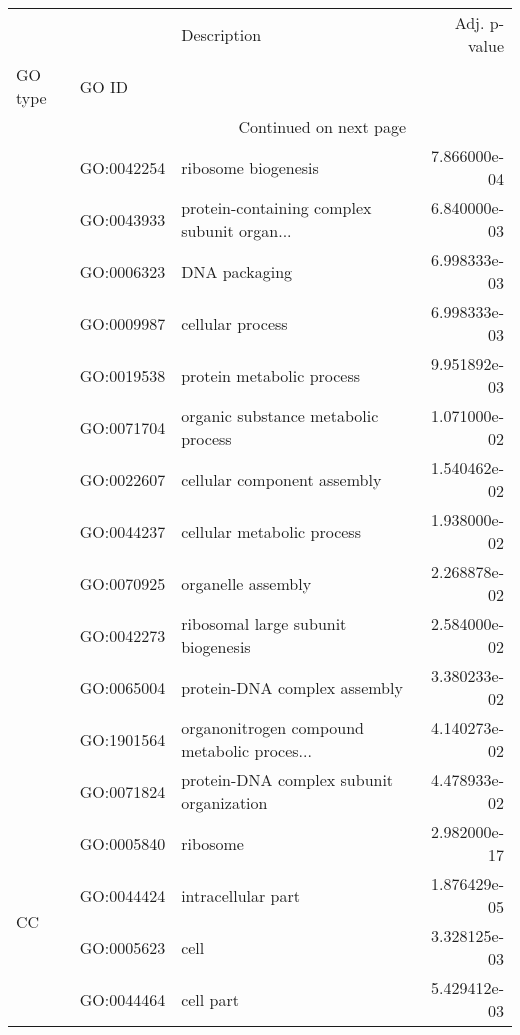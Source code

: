 \begin{longtable}{lllr}
\toprule
   &            &                                  Description &  Adj. p-value \\
GO type & GO ID &                                              &               \\
\midrule
\endhead
\midrule
\multicolumn{3}{r}{{Continued on next page}} \\
\midrule
\endfoot

\bottomrule
\endlastfoot
\multirow{13}{*}{BP} & GO:0042254 &                          ribosome biogenesis &  7.866000e-04 \\
   & GO:0043933 &  protein-containing complex subunit organ... &  6.840000e-03 \\
   & GO:0006323 &                                DNA packaging &  6.998333e-03 \\
   & GO:0009987 &                             cellular process &  6.998333e-03 \\
   & GO:0019538 &                    protein metabolic process &  9.951892e-03 \\
   & GO:0071704 &          organic substance metabolic process &  1.071000e-02 \\
   & GO:0022607 &                  cellular component assembly &  1.540462e-02 \\
   & GO:0044237 &                   cellular metabolic process &  1.938000e-02 \\
   & GO:0070925 &                           organelle assembly &  2.268878e-02 \\
   & GO:0042273 &           ribosomal large subunit biogenesis &  2.584000e-02 \\
   & GO:0065004 &                 protein-DNA complex assembly &  3.380233e-02 \\
   & GO:1901564 &  organonitrogen compound metabolic proces... &  4.140273e-02 \\
   & GO:0071824 &     protein-DNA complex subunit organization &  4.478933e-02 \\
\cline{1-4}
\multirow{23}{*}{CC} & GO:0005840 &                                     ribosome &  2.982000e-17 \\
   & GO:0044424 &                           intracellular part &  1.876429e-05 \\
   & GO:0005623 &                                         cell &  3.328125e-03 \\
   & GO:0044464 &                                    cell part &  5.429412e-03 \\

\end{longtable}
